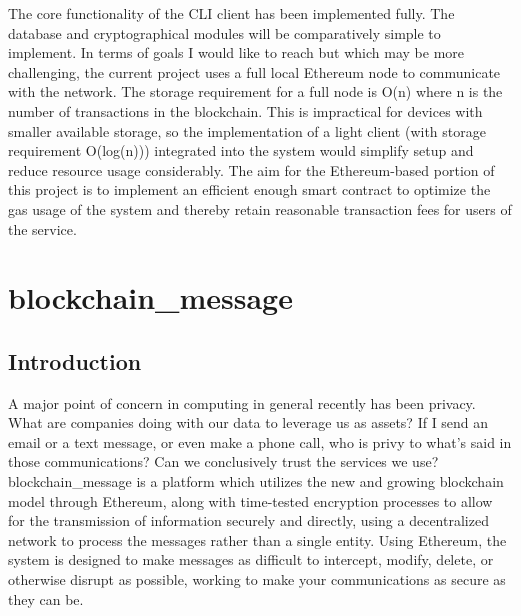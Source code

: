 \documentclass[titlepage]{report}
\begin{document}
The core functionality of the CLI client has been implemented fully. The database and cryptographical modules will be comparatively simple to implement. In terms of goals I would like to reach but which may be more challenging, the current project uses a full local Ethereum node to communicate with the network. The storage requirement for a full node is O(n) where n is the number of transactions in the blockchain. This is impractical for devices with smaller available storage, so the implementation of a \gls{light client} (with storage requirement O(log(n))) integrated into the system would simplify setup and reduce resource usage considerably. The aim for the Ethereum-based portion of this project is to implement an efficient enough smart contract to optimize the gas usage of the system and thereby retain reasonable transaction fees for users of the service.

\chapter{blockchain\_message}
\section{Introduction}
A major point of concern in computing in general recently has been privacy. What are companies doing with our data to leverage us as assets? If I send an email or a text message, or even make a phone call, who is privy to what's said in those communications? Can we conclusively trust the services we use? blockchain\_message is a platform which utilizes the new and growing blockchain model through Ethereum, along with time-tested encryption processes to allow for the transmission of information securely and directly, using a decentralized network to process the messages rather than a single entity. Using Ethereum, the system is designed to make messages as difficult to intercept, modify, delete, or otherwise disrupt as possible, working to make your communications as secure as they can be.

\pagebreak
\end{document}
